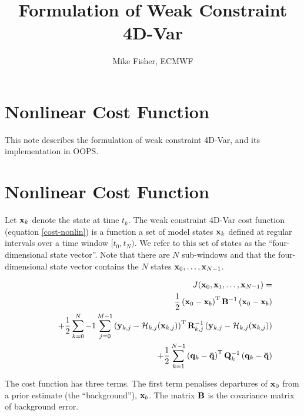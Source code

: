 \documentclass[12pt]{article}
\title{Formulation of Weak Constraint 4D-Var}
\author{Mike Fisher, ECMWF}
\newcommand{\vect}[1]{{\bf #1}}                         %
\newcommand{\mat}[1]{{\bf #1}}                          %
\newcommand{\calH}{{\cal H}}                           %
\newcommand{\rmT}{{\rm T}}                           %
\begin{document}
\maketitle

\section{Nonlinear Cost Function}
This note describes the formulation of weak constraint 4D-Var, and its
implementation in OOPS.

\section{Nonlinear Cost Function}

Let $\vect{x}_k$ denote the state at time $t_k$.  The weak constraint 4D-Var
cost function (equation \ref{cost-nonlin})
is a function a set of model states $\vect{x}_k$ defined at regular intervals
over a time window $[ t_0 , t_N )$. We refer to this set of states as
the ``four-dimensional state vector''. Note that there are $N$ sub-windows and
that the four-dimensional state vector contains the $N$ states
$\vect{x}_0 , \ldots , \vect{x}_{N-1}$.

\begin{eqnarray}
\label{cost-nonlin}
&&  J( \vect{x}_0 , \vect{x}_1 , \ldots , \vect{x}_{N-1} ) = \\
&&\qquad \phantom{+}
           \frac{1}{2} \left( \vect{x}_0 - \vect{x}_b \right)^\rmT
                      \mat{B}^{-1}
                       \left( \vect{x}_0 - \vect{x}_b \right) \nonumber \\
&&\qquad + \frac{1}{2} \sum_{k=0}^N-1 \sum_{j=0}^{M-1}
             \left( \vect{y}_{k,j} - \calH_{k,j} (\vect{x}_{k,j} ) \right)^\rmT
                      \mat{R}_{k,j}^{-1}
             \left( \vect{y}_{k,j} - \calH_{k,j} (\vect{x}_{k,j} ) \right)
                        \nonumber \\
&&\qquad + \frac{1}{2} \sum_{k=1}^{N-1}
                       \left( \vect{q}_k - \vect{\bar q}  \right)^\rmT
                      \mat{Q}_k^{-1}
                       \left( \vect{q}_k - \vect{\bar q}  \right)
                        \nonumber
\end{eqnarray}

The cost function has three terms. The first term penalises departures
of $\vect{x}_0$ from a prior estimate (the ``background''), $\vect{x}_b$.
The matrix $\mat{B}$ is the covariance matrix of background error.
\end{document}
